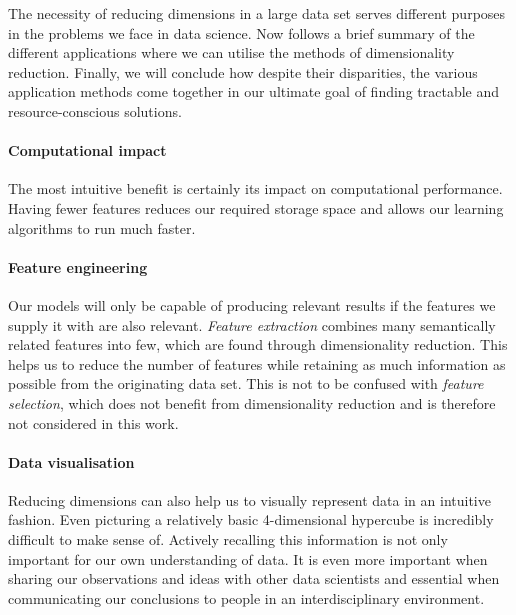 The necessity of reducing dimensions in a large data set serves different purposes in the problems we face in data science. 
Now follows a brief summary of the different applications where we can utilise the methods of dimensionality reduction. 
Finally, we will conclude how despite their disparities, the various application methods come together in our ultimate goal of finding tractable and resource-conscious solutions.
\vspace{-5mm}

\paragraph{Computational impact}

The most intuitive benefit is certainly its impact on computational performance.
Having fewer features reduces our required storage space and allows our learning algorithms to run much faster. \cite{PythonMachineLearningCh1}
\vspace{-5mm}

\paragraph{Feature engineering}

Our models will only be capable of producing relevant results if the features we supply it with are also relevant. \cite{HandsOnMLCh1}
\emph{Feature extraction} combines many semantically related features into few, which are found through dimensionality reduction. 
This helps us to reduce the number of features while retaining as much information as possible from the originating data set.
This is not to be confused with \emph{feature selection}, which does not benefit from dimensionality reduction and is therefore not considered in this work.
\vspace{-5mm}

\paragraph{Data visualisation}

Reducing dimensions can also help us to visually represent data in an intuitive fashion.
Even picturing a relatively basic 4-dimensional hypercube is incredibly difficult to make sense of.
Actively recalling this information is not only important for our own understanding of data. It is even more important when sharing our observations and ideas with other data scientists and essential when communicating our conclusions to people in an interdisciplinary environment. \cite{PythonMachineLearningCh5}
\vspace{-5mm}

